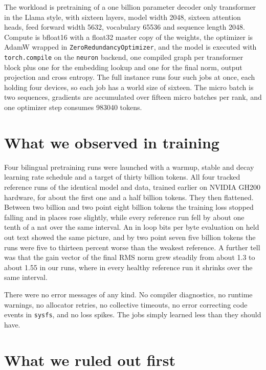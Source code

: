 \documentclass[11pt,a4paper]{article}
\newcommand{\code}[1]{\texttt{\small #1}}
\begin{document}
\medskip

The workload is pretraining of a one billion parameter decoder only transformer
in the Llama style, with sixteen layers, model width 2048, sixteen attention
heads, feed forward width 5632, vocabulary 65536 and sequence length 2048.
Compute is bfloat16 with a float32 master copy of the weights, the optimizer is
AdamW wrapped in \code{ZeroRedundancyOptimizer}, and the model is executed with
\code{torch.compile} on the \code{neuron} backend, one compiled graph per
transformer block plus one for the embedding lookup and one for the final norm,
output projection and cross entropy. The full instance runs four such jobs at
once, each holding four devices, so each job has a world size of sixteen. The
micro batch is two sequences, gradients are accumulated over fifteen micro
batches per rank, and one optimizer step consumes 983040 tokens.

\section{What we observed in training}

Four bilingual pretraining runs were launched with a warmup, stable and decay
learning rate schedule and a target of thirty billion tokens. All four tracked
reference runs of the identical model and data, trained earlier on NVIDIA GH200
hardware, for about the first one and a half billion tokens. They then flattened.
Between two billion and two point eight billion tokens the training loss stopped
falling and in places rose slightly, while every reference run fell by about one
tenth of a nat over the same interval. An in loop bits per byte evaluation on
held out text showed the same picture, and by two point seven five billion tokens
the runs were five to thirteen percent worse than the weakest reference. A
further tell was that the gain vector of the final RMS norm grew steadily from
about 1.3 to about 1.55 in our runs, where in every healthy reference run it
shrinks over the same interval.

There were no error messages of any kind. No compiler diagnostics, no runtime
warnings, no allocator retries, no collective timeouts, no error correcting code
events in \code{sysfs}, and no loss spikes. The jobs simply learned less than
they should have.

\section{What we ruled out first}
\end{document}
